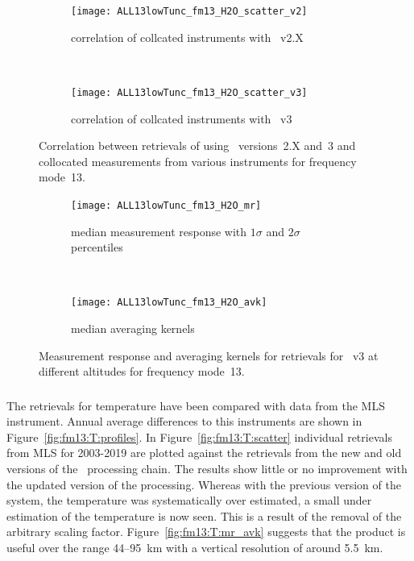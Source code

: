 \begin{figure}[tbhp]
    \centering
    \begin{subfigure}[b]{0.49\textwidth}
        \texttt{[image: ALL13lowTunc\_fm13\_H2O\_scatter\_v2]}
        \caption{correlation of collcated instruments with \smr~v2.X}
        \label{fig:fm13:H2O:scatter:v2}
    \end{subfigure}
    \,
    \begin{subfigure}[b]{0.49\textwidth}
        \texttt{[image: ALL13lowTunc\_fm13\_H2O\_scatter\_v3]}
        \caption{correlation of collcated instruments with \smr~v3}
        \label{fig:fm13:H2O:scatter:v3}
    \end{subfigure}
    \caption{Correlation between retrievals of  using \smr\
    versions~2.X and~3 and collocated measurements from various instruments
    for frequency mode~13.}
    \label{fig:fm13:H2O:scatter}
\end{figure}

\begin{figure}[tbhp]
    \centering
    \begin{subfigure}[b]{0.49\textwidth}
        \texttt{[image: ALL13lowTunc\_fm13\_H2O\_mr]}
        \caption{median measurement response with $1\sigma$ and $2\sigma$
        percentiles}
        \label{fig:fm13:H2O:mr}
    \end{subfigure}
    \,
    \begin{subfigure}[b]{0.49\textwidth}
        \texttt{[image: ALL13lowTunc\_fm13\_H2O\_avk]}
        \caption{median averaging kernels\newline~}
        \label{fig:fm13:H2O:avk}
    \end{subfigure}
    \caption{Measurement response and averaging kernels for 
    retrievals for \smr~v3 at different altitudes for frequency mode~13.}
    \label{fig:fm13:H2O:mr_avk}
\end{figure}



\subsubsection{}
\label{sec:fm13:comparison:temperature}
The retrievals for temperature have been compared with data from the MLS
instrument. Annual average differences to this instruments are shown in
Figure~\ref{fig:fm13:T:profiles}. In Figure~\ref{fig:fm13:T:scatter} individual
retrievals from MLS for 2003-2019 are plotted against the retrievals
from the new and old versions of the \smr\ processing chain. The results show
little or no improvement with the updated version of the processing. Whereas
with the previous version of the system, the temperature was systematically
over estimated, a small under estimation of the temperature is now seen. This
is a result of the removal of the arbitrary scaling factor.
Figure~\ref{fig:fm13:T:mr_avk} suggests that the product is useful over the
range 44--95~km with a vertical resolution of around 5.5~km.

